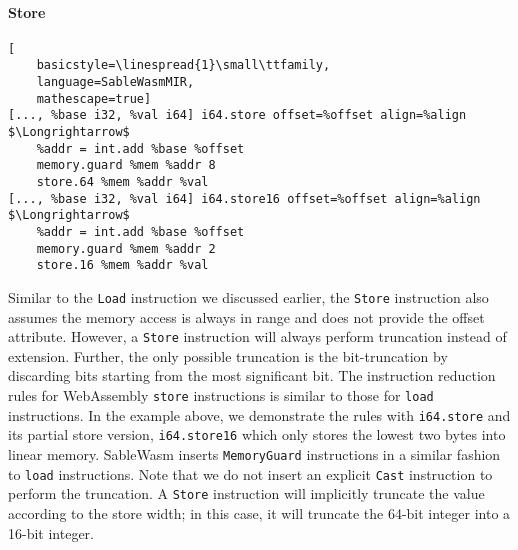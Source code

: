 \paragraph{Store} \quad
\begin{lstlisting}[
    basicstyle=\linespread{1}\small\ttfamily, 
    language=SableWasmMIR, 
    mathescape=true]
[..., %base i32, %val i64] i64.store offset=%offset align=%align $\Longrightarrow$
    %addr = int.add %base %offset
    memory.guard %mem %addr 8
    store.64 %mem %addr %val
[..., %base i32, %val i64] i64.store16 offset=%offset align=%align $\Longrightarrow$
    %addr = int.add %base %offset
    memory.guard %mem %addr 2
    store.16 %mem %addr %val
\end{lstlisting}
Similar to the \texttt{Load} instruction we discussed earlier, the
\texttt{Store} instruction also assumes the memory access is always in range and
does not provide the offset attribute. However, a \texttt{Store} instruction
will always perform truncation instead of extension. Further, the only possible
truncation is the bit-truncation by discarding bits starting from the most
significant bit. The instruction reduction rules for WebAssembly \texttt{store}
instructions is similar to those for \texttt{load} instructions. In the example
above, we demonstrate the rules with \texttt{i64.store} and its partial store
version, \texttt{i64.store16} which only stores the lowest two bytes into linear
memory. SableWasm inserts \texttt{MemoryGuard} instructions in a similar fashion
to \texttt{load} instructions. Note that we do not insert an explicit
\texttt{Cast} instruction to perform the truncation. A \texttt{Store}
instruction will implicitly truncate the value according to the store width; in
this case, it will truncate the 64-bit integer into a 16-bit integer.

